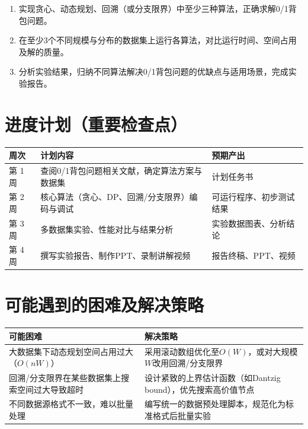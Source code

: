 \documentclass[6pt,a4paper]{ctexart}
\begin{document}
\begin{enumerate}[leftmargin=2.5em,itemsep=0.25em]
  \item 实现贪心、动态规划、回溯（或分支限界）中至少三种算法，正确求解0/1背包问题。
  \item 在至少3个不同规模与分布的数据集上运行各算法，对比运行时间、空间占用及解的质量。
  \item 分析实验结果，归纳不同算法解决0/1背包问题的优缺点与适用场景，完成实验报告。
\end{enumerate}

\section{进度计划（重要检查点）}

\begin{tabular}{p{2.3cm}p{7.4cm}p{4.2cm}}
\toprule
周次 & 计划内容 & 预期产出 \\
\midrule
第 1 周 & 查阅0/1背包问题相关文献，确定算法方案与数据集 & 计划任务书 \\
第 2 周 & 核心算法（贪心、DP、回溯/分支限界）编码与调试 & 可运行程序、初步测试结果 \\
第 3 周 & 多数据集实验、性能对比与结果分析 & 实验数据图表、分析结论 \\
第 4 周 & 撰写实验报告、制作PPT、录制讲解视频 & 报告终稿、PPT、视频 \\
\bottomrule
\end{tabular}

\setcounter{section}{4}

\section{可能遇到的困难及解决策略}

\begin{tabular}{p{7.1cm}p{7.1cm}}
\toprule
可能困难 & 解决策略 \\
\midrule
大数据集下动态规划空间占用过大（$O(nW)$）
&
采用滚动数组优化至$O(W)$，或对大规模$W$改用回溯/分支限界
\\
回溯/分支限界在某些数据集上搜索空间过大导致超时
&
设计紧致的上界估计函数（如Dantzig bound），优先搜索高价值节点
\\
不同数据源格式不一致，难以批量处理
&
编写统一的数据预处理脚本，规范化为标准格式后批量实验
\\
\bottomrule
\end{tabular}

\vspace{0.8cm}
\end{document}
